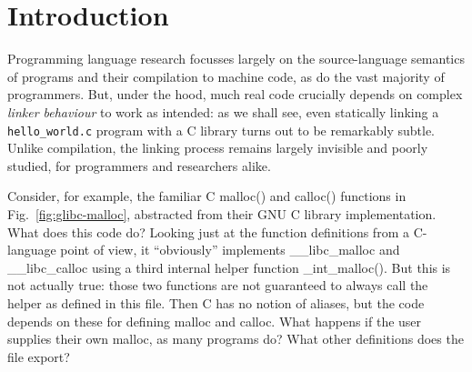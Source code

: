 \section{Introduction}

Programming language research focusses largely on the source-language
semantics of programs and their compilation to machine code, as do the
vast majority of programmers.
But, under the hood, much real code crucially depends on complex
\emph{linker behaviour} to work as intended:  as we shall see, even statically linking
a \texttt{hello\_world.c} program with a C library turns out to be
remarkably subtle.  
%
Unlike compilation, the linking process remains largely invisible and
poorly studied, %
for programmers and researchers alike.

Consider, for example, the familiar C \textsf{malloc()} and \textsf{calloc()}
functions in Fig.~\ref{fig:glibc-malloc}, abstracted from their GNU C
library implementation.
What does this code do?
Looking just at the function definitions from a C-language point of view, it ``obviously'' implements 
\textsf{\_\_libc\_malloc} and \textsf{\_\_libc\_calloc} using a third
internal helper function \textsf{\_int\_malloc()}.
%
But this is not actually true: those two functions are not guaranteed
to always call the helper as defined in this file.  
%
Then C has no notion of aliases, 
but the code depends on these for defining \textsf{malloc} and \textsf{calloc}.
What happens if the user supplies their own \textsf{malloc}, as many
programs do?  What other definitions does the file export?


